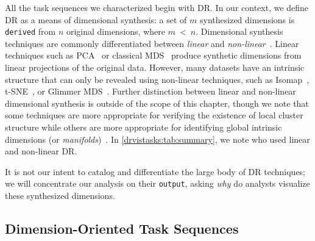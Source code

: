 
All the task sequences we characterized begin with \ac{DR}.
In our context, we define \ac{DR} as a means of dimensional synthesis: a set of $m$ synthesized dimensions is {\tt derived} from $n$ original dimensions, where $m$~\textless~$n$. 
Dimensional synthesis techniques are commonly differentiated between {\it linear} and {\it non-linear}~\cite{Jain2000}. 
Linear techniques such as \ac{PCA}~\cite{Jolliffe2002} or classical \ac{MDS}~\cite{Torgerson1952,Young1938} produce synthetic dimensions from linear projections of the original data. 
However, many datasets have an intrinsic structure that can only be revealed using non-linear techniques, such as Isomap~\cite{Tenenbaum2000}, \ac{t-SNE}~\cite{VanderMaaten2008}, or Glimmer \ac{MDS}~\cite{Ingram2009}.
Further distinction between linear and non-linear dimensional synthesis is outside of the scope of this chapter, though we note that some techniques are more appropriate for verifying the existence of local cluster structure while others are more appropriate for identifying global intrinsic dimensions (or {\it manifolds})~\cite{Lewis2012}.
In \autoref{drvistasks:tab:summary}, we note who used linear and non-linear \ac{DR}.

It is not our intent to catalog and differentiate the large body of \ac{DR} techniques; we will concentrate our analysis on their {\tt output}, asking {\it why} do analysts visualize these synthesized dimensions.


\subsection{Dimension-Oriented Task Sequences}
\label{drvistasks:tasks:dims}

